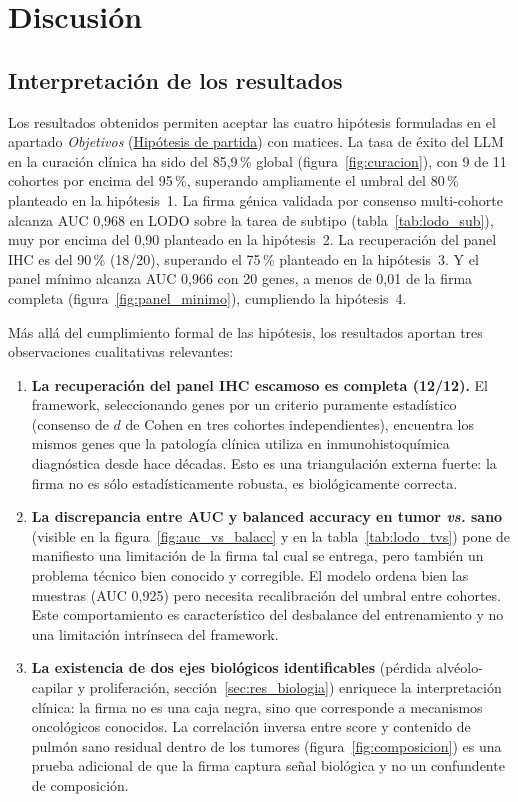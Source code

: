\chapter{Discusión}
\label{cap:discusion}

\section{Interpretación de los resultados}
\label{sec:disc_interpretacion}

Los resultados obtenidos permiten aceptar las cuatro hipótesis formuladas
en el apartado \emph{Objetivos} (\hyperref[sec:hipotesis]{Hipótesis de
partida}) con matices. La tasa de éxito del LLM en
la curación clínica ha sido del 85,9\,\% global
(figura~\ref{fig:curacion}), con 9 de 11 cohortes por encima del 95\,\%,
superando ampliamente el umbral del 80\,\% planteado en la hipótesis~1.
La firma génica validada por consenso multi-cohorte alcanza AUC 0,968 en
LODO sobre la tarea de subtipo (tabla~\ref{tab:lodo_sub}), muy por encima
del 0,90 planteado en la hipótesis~2. La recuperación del panel IHC es del
90\,\% (18/20), superando el 75\,\% planteado en la hipótesis~3. Y el
panel mínimo alcanza AUC 0,966 con 20 genes, a menos de 0,01 de la firma
completa (figura~\ref{fig:panel_minimo}), cumpliendo la hipótesis~4.

Más allá del cumplimiento formal de las hipótesis, los resultados aportan
tres observaciones cualitativas relevantes:

\begin{enumerate}
  \item \textbf{La recuperación del panel IHC escamoso es completa
  (12/12).} El framework, seleccionando genes por un criterio puramente
  estadístico (consenso de $d$ de Cohen en tres cohortes independientes),
  encuentra los mismos genes que la patología clínica utiliza en
  inmunohistoquímica diagnóstica desde hace décadas. Esto es una
  triangulación externa fuerte: la firma no es sólo estadísticamente
  robusta, es biológicamente correcta.
  \item \textbf{La discrepancia entre AUC y balanced accuracy en tumor
  \emph{vs.} sano} (visible en la figura~\ref{fig:auc_vs_balacc} y en la
  tabla~\ref{tab:lodo_tvs}) pone de manifiesto una limitación de la firma
  tal cual se entrega, pero también un problema técnico bien conocido y
  corregible. El modelo ordena bien las muestras (AUC 0,925) pero necesita
  recalibración del umbral entre cohortes. Este comportamiento es
  característico del desbalance del entrenamiento y no una limitación
  intrínseca del framework.
  \item \textbf{La existencia de dos ejes biológicos identificables}
  (pérdida alvéolo-capilar y proliferación, sección~\ref{sec:res_biologia})
  enriquece la interpretación clínica: la firma no es una caja negra,
  sino que corresponde a mecanismos oncológicos conocidos. La correlación
  inversa entre score y contenido de pulmón sano residual dentro de los
  tumores (figura~\ref{fig:composicion}) es una prueba adicional de que
  la firma captura señal biológica y no un confundente de composición.
\end{enumerate}

